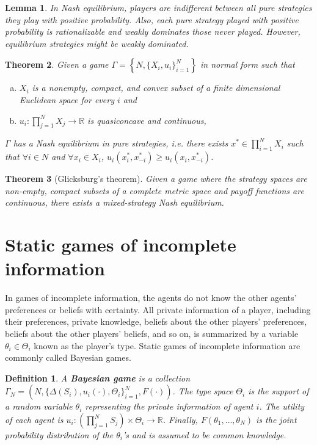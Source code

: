 \documentclass[letter, 11pt]{article}
\theoremstyle{basic}
\newtheorem{definition}{Definition}[section]
\newtheorem{theorem}{Theorem}[section]
\newtheorem{lemma}[theorem]{Lemma}
\newcommand{\R}{\mathbb{R}}
\begin{document}
\begin{spacing}{1.0}
\begin{lemma}
  In Nash equilibrium, players are indifferent between all pure strategies
  they play with positive probability. Also, each pure strategy played with
  positive probability is rationalizable and weakly dominates those never
  played. However, equilibrium strategies might be weakly dominated.
\end{lemma}

\begin{theorem}
  Given a game $\Gamma = \left\{N, \{X_i, u_i\}_{i=1}^N\right\}$ in normal
  form such that
  \begin{enumerate}[a)]\leftskip = 1em
  \item $X_i$ is a nonempty, compact, and convex subset of a finite
    dimensional Euclidean space for every $i$ and
  \item $u_i : \prod_{j=1}^N X_j \to \R$ is quasiconcave and continuous,
  \end{enumerate}
  $\Gamma$ has a Nash equilibrium in pure strategies, i.e. there exists
  $x^* \in \prod_{i=1}^N X_i$ such that $\forall i \in N$ and $\forall
  x_i\in X_i$, $ u_i(x_i^*, x_{-i}^*) \geq u_i(x_i, x_{-i}^*)$.
\end{theorem}

\begin{theorem}[Glicksburg's theorem]
  Given a game where the strategy spaces are
  non-empty, compact subsets of a complete metric space and payoff
  functions are continuous, there exists a mixed-strategy Nash equilibrium.
\end{theorem}

\section{Static games of incomplete information}

In games of incomplete information, the agents do not know the other
agents' preferences or beliefs with certainty. All private information of a
player, including their preferences, private knowledge, beliefs about the
other players' preferences, beliefs about the other players' beliefs, and
so on, is summarized by a variable $\theta_i \in \Theta_i$ known as the
player's type. Static games of incomplete information are commonly called
Bayesian games.

\begin{definition}
  A \textbf{Bayesian game} is a collection $\Gamma_N = \left(N, \{\Delta(S_i),
    u_i(\cdot), \Theta_i\}_{i=1}^N, F(\cdot)\right)$. The type space $\Theta_i$
  is the support of a random variable $\theta_i$ representing the private
  information of agent $i$.  The utility of each agent is $u_i: \left(
    \prod_{j=1}^N S_j\right) \times \Theta_i  \to \R$. Finally, $F(\theta_1, \ldots, \theta_N)$ is the
  joint probability distribution of the $\theta_i$'s and is assumed to be
  common knowledge.
\end{definition}


\end{spacing}
\end{document}
